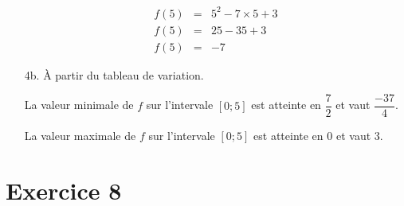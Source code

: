 \documentclass[11pt]{article}
\begin{document}
\begin{enumerate}
\begin{multicols}{2}
    \begin{eqnarray*}
      f(5) &=& 5^2 -7 \times 5 + 3 \\
      f(5) &=& 25 - 35 + 3 \\
      f(5) &=& -7
    \end{eqnarray*}
  \end{multicols}


\item[4b.] À partir du tableau de variation.

  La valeur minimale de $f$ sur l'intervale $[0 ; 5]$ est atteinte en $\dfrac{7}{2}$ et vaut $\dfrac{-37}{4}$.

  La valeur maximale de $f$ sur l'intervale $[0 ; 5]$ est atteinte en $0$ et vaut $3$.

\end{enumerate}

\newpage
\section{Exercice 8}
\end{document}
